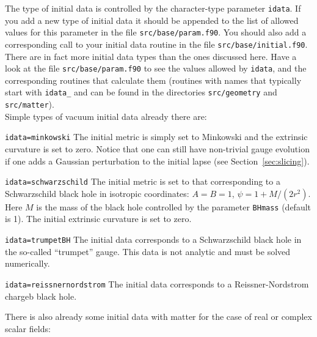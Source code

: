 \documentclass[12pt]{article}
\begin{document}
The type of initial data is controlled by the character-type parameter
\texttt{idata}.  If you add a new type of initial data it should be
appended to the list of allowed values for this parameter in the file
\texttt{src/base/param.f90}.  You should also add a corresponding call
to your initial data routine in the file
\texttt{src/base/initial.f90}. \\

There are in fact more initial data types than the ones discussed
here. Have a look at the file \texttt{src/base/param.f90} to see the
values allowed by \texttt{idata}, and the corresponding routines that
calculate them (routines with names that typically start with
\texttt{idata\_} and can be found in the directories
\texttt{src/geometry} and \texttt{src/matter}). \\

Simple types of vacuum initial data already there are:

\begin{list}{}{
\setlength{\leftmargin}{55mm}
\setlength{\labelsep}{10mm}
\setlength{\labelwidth}{50mm}}

\item[\texttt{idata=minkowski}] The initial metric is simply set to
  Minkowski and the extrinsic curvature is set to zero.  Notice that
  one can still have non-trivial gauge evolution if one adds a
  Gaussian perturbation to the initial lapse (see
  Section~\ref{sec:slicing}).

\item[\texttt{idata=schwarzschild}] The initial metric is set to that
  corresponding to a Schwarzschild black hole in isotropic coordinates:
  $A=B=1$, $\psi=1 + M/(2r^2)$. Here $M$ is the mass of the black
  hole controlled by the parameter \texttt{BHmass} (default is 1).
  The initial extrinsic curvature is set to zero.

\item[\texttt{idata=trumpetBH}] The initial data corresponds to a
  Schwarzschild black hole in the so-called ``trumpet'' gauge. This
  data is not analytic and must be solved numerically.

\item[\texttt{idata=reissnernordstrom}] The initial data corresponds
to a Reissner-Nordstrom chargeb black hole.

\end{list}

\vspace{5mm}

There is also already some initial data with matter for the case of
real or complex scalar fields:
\end{document}
